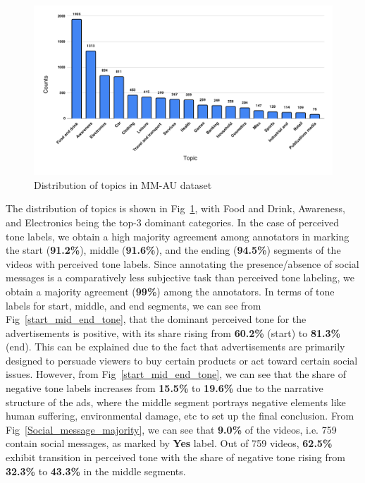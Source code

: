 \begin{figure}[h!]
  \centering
  \includegraphics[width=\textwidth]{figures/topic_listing_new_pdf.pdf}
  \caption{Distribution of topics in MM-AU dataset}
  \label{topics}
\end{figure}
The distribution of topics is shown in Fig~\ref{topics}, with Food and Drink, Awareness, and Electronics being the top-3 dominant categories. In the case of perceived tone labels, we obtain a high majority agreement among annotators in marking the start (\textbf{91.2\%}), middle (\textbf{91.6\%}), and the ending (\textbf{94.5\%}) segments of the videos with perceived tone labels. Since annotating the presence/absence of social messages is a comparatively less subjective task than perceived tone labeling, we obtain a majority agreement (\textbf{99\%}) among the annotators. In terms of tone labels for start, middle, and end segments, we can see from Fig~\ref{start_mid_end_tone}, that the dominant perceived tone for the advertisements is positive, with its share rising from \textbf{60.2\%} (start) to \textbf{81.3\%} (end). This can be explained due to the fact that advertisements are primarily designed to persuade viewers to buy certain products or act toward certain social issues. However, from Fig~\ref{start_mid_end_tone}, we can see that the share of negative tone labels increases from \textbf{15.5\%} to \textbf{19.6\%} due to the narrative structure of the ads, where the middle segment portrays negative elements like human suffering, environmental damage, etc to set up the final conclusion. From Fig~\ref{Social_message_majority}, we can see that \textbf{9.0\%} of the videos, i.e. 759 contain social messages, as marked by \textbf{Yes} label. Out of 759 videos, \textbf{62.5\%} exhibit transition in perceived tone with the share of negative tone rising from \textbf{32.3\%} to \textbf{43.3\%} in the middle segments.

